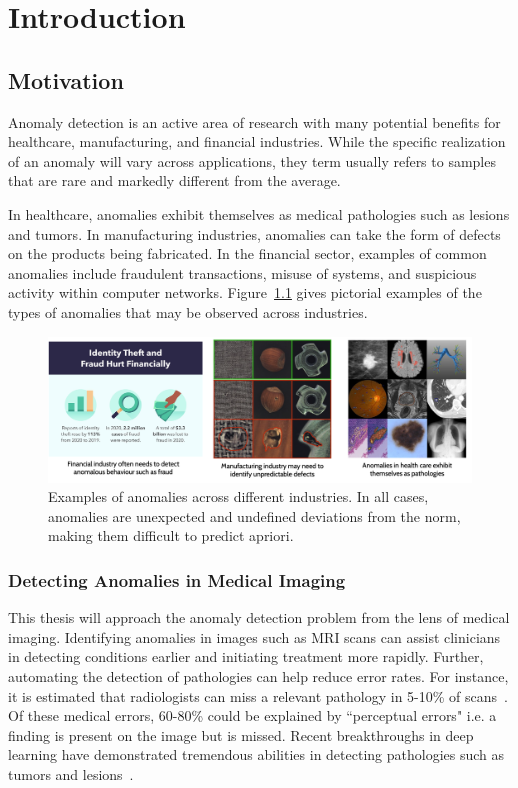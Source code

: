 \chapter{Introduction}

\section{Motivation}

Anomaly detection is an active area of research with many potential benefits for healthcare, manufacturing, and financial industries. While the specific realization of an anomaly will vary across applications, they term usually refers to samples that are rare and markedly different from the average.

In healthcare, anomalies exhibit themselves as medical pathologies such as lesions and tumors. In  manufacturing industries, anomalies can take the form of defects on the products being fabricated. In the financial sector, examples of common anomalies include fraudulent transactions, misuse of systems, and suspicious activity within computer networks. Figure~\ref{fig:anoex} gives pictorial examples of the types of anomalies that may be observed across industries.

\begin{figure}[bhp]
\centering
    \centering
    \includegraphics[width=\textwidth]{figures/anomaly_examples.png}
    \caption{Examples of anomalies across different industries. In all cases, anomalies are unexpected and undefined deviations from the norm, making them difficult to predict apriori.}
    \label{fig:anoex}

\end{figure}%

\subsection*{Detecting Anomalies in Medical Imaging}
This thesis will approach the anomaly detection problem from the lens of medical imaging.
Identifying anomalies in images such as MRI scans can assist clinicians in detecting conditions earlier and initiating treatment more rapidly. Further, automating the detection of pathologies can help reduce error rates. For instance, it is estimated that radiologists can miss a relevant pathology in 5-10\% of scans~\cite{bruno_understanding_2015}. Of these medical errors, 60-80\% could be explained by ``perceptual errors" i.e. a finding is present on the image but is missed. Recent breakthroughs in deep learning have demonstrated tremendous abilities in detecting pathologies such as tumors and lesions~\cite{kim_deep_2019,lee_deep_2017}.


